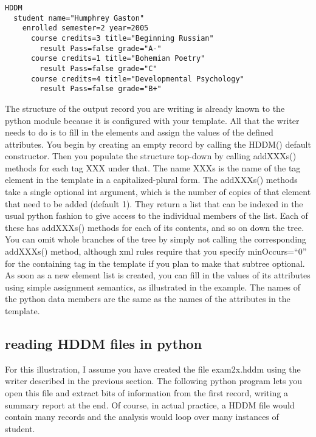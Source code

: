 \documentclass{revtex4}
\begin{document}
\vspace{0.5cm}
\begin{minipage}{12cm}
\begin{verbatim}
HDDM
  student name="Humphrey Gaston"
    enrolled semester=2 year=2005
      course credits=3 title="Beginning Russian"
        result Pass=false grade="A-"
      course credits=1 title="Bohemian Poetry"
        result Pass=false grade="C"
      course credits=4 title="Developmental Psychology"
        result Pass=false grade="B+"
\end{verbatim}
\end{minipage}
\vspace{0.5cm}

The structure of the output record you are writing is already known to
the python module because it is configured with your template. All that
the writer needs to do is to fill in the elements and assign the values
of the defined attributes. You begin by creating an empty record by calling
the HDDM() default constructor. Then you populate the structure top-{}down
by calling addXXXs() methods for each tag XXX under that. The name XXXs
is the name of the tag element in the template in a capitalized-{}plural 
form. The addXXXs() methods take a single optional int argument, which
is the number of copies of that element that need to be added (default 1).
They return a list that can be indexed in the usual python fashion to give
access to the individual members of the list. Each of these has addXXXs()
methods for each of its contents, and so on down the tree. You can omit
whole branches of the tree by simply not calling the corresponding 
addXXXs() method, although xml rules require that you specify minOccurs=``0''
for the containing tag in the template if you plan to make that subtree
optional. As soon as a new element list is created, you can fill in the
values of its attributes using simple assignment semantics, as illustrated
in the example. The names of the python data members are the same as the
names of the attributes in the template.

\subsection{reading HDDM files in python}

For this illustration, I assume you have created the file exam2x.hddm using
the writer described in the previous section. The following python program
lets you open this file and extract bits of information from the first record,
writing a summary report at the end. Of course, in actual practice, a HDDM
file would contain many records and the analysis would loop over many instances
of student.
\end{document}
